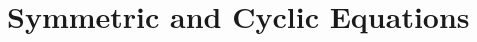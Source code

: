 \documentclass[../../../main.tex]{subfiles}
\begin{document}
\section{Symmetric and Cyclic Equations}
\end{document}
